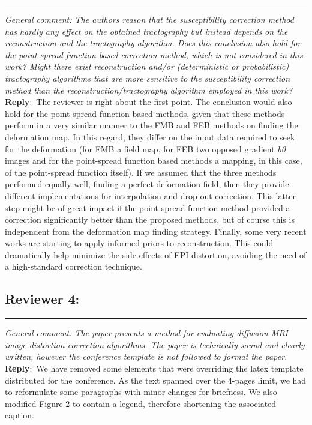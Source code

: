\documentclass[letter]{memoir}
\newcommand{\pointRaised}[2]{\medskip \hrule \noindent 
               \textsl{{\fontseries{b}\selectfont #1}: #2}}
\newcommand{\reply}{\noindent \textbf{Reply}:\ }
\begin{document}
\pointRaised{General comment}
{The authors reason that the susceptibility correction method has hardly
  any effect on the obtained tractography but instead depends on the
  reconstruction and the tractography algorithm.
Does this conclusion also hold for the point-spread function based correction
  method, which is not considered in this work?
Might there exist reconstruction and/or (deterministic or probabilistic)
  tractography algorithms that are more sensitive to the susceptibility correction
  method than the reconstruction/tractography algorithm employed in this work?
}
\reply{The reviewer is right about the first point.
The conclusion would also hold for the point-spread function based methods, given
  that these methods perform in a very similar manner to the FMB and FEB
  methods on finding the deformation map.
In this regard, they differ on the input data required to seek for the deformation
  (for FMB a field map, for FEB two opposed gradient \emph{b0} images and for the
  point-spread function based methods a mapping, in this case, of the point-spread function
  itself).
If we assumed that the three methods performed equally well, finding a perfect deformation
  field, then they provide different implementations for interpolation and drop-out correction.
This latter step might be of great impact if the point-spread function method provided
  a correction significantly better than the proposed methods, but of course this is
  independent from the deformation map finding strategy.
Finally, some very recent works are starting to apply informed priors to reconstruction.
This could dramatically help minimize the side effects of EPI distortion, avoiding
  the need of a high-standard correction technique.}
  
  
\subsection*{Reviewer 4:}
\pointRaised{General comment}%
{The paper presents a method for evaluating diffusion MRI
  image distortion correction algorithms.
The paper is technically sound and clearly written, however the
  conference template is not followed to format the paper.
}
\reply{We have removed some elements that were overriding the
  latex template distributed for the conference.
  As the text spanned over the 4-pages limit, we had to
  reformulate some paragraphs with minor changes for briefness.
  We also modified Figure 2 to contain a legend, therefore
  shortening the associated caption.}
\end{document}
